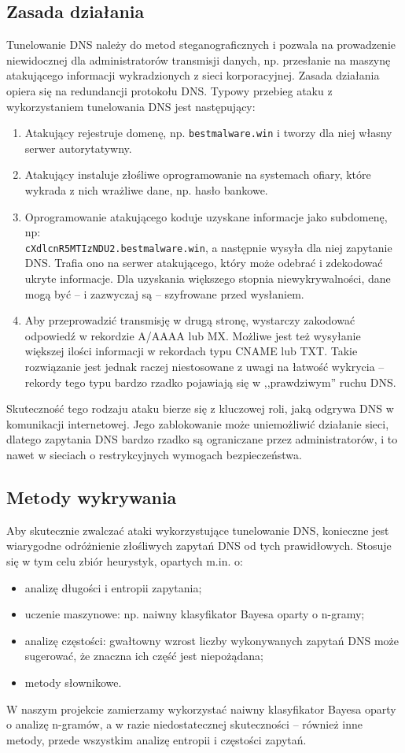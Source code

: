 \documentclass{eiti-raport}
\begin{document}
\subsection{Zasada działania}
Tunelowanie DNS należy do metod steganograficznych i pozwala na prowadzenie niewidocznej dla administratorów transmisji danych, np. przesłanie na maszynę atakującego informacji wykradzionych z sieci korporacyjnej. Zasada działania opiera się na redundancji protokołu DNS. Typowy przebieg ataku z wykorzystaniem tunelowania DNS jest następujący:
\begin{enumerate}
	\item Atakujący rejestruje domenę, np. \texttt{bestmalware.win} i tworzy dla niej własny serwer autorytatywny. 
	\item Atakujący instaluje złośliwe oprogramowanie na systemach ofiary, które wykrada z nich wrażliwe dane, np. hasło bankowe. 
	\item Oprogramowanie atakującego koduje uzyskane informacje jako subdomenę, np: \\  \texttt{cXdlcnR5MTIzNDU2.bestmalware.win}, a następnie wysyła dla niej zapytanie DNS. Trafia ono na serwer atakującego, który może odebrać i zdekodować ukryte informacje. Dla uzyskania większego stopnia niewykrywalności, dane mogą być -- i zazwyczaj są -- szyfrowane przed wysłaniem. 
	\item Aby przeprowadzić transmisję w drugą stronę, wystarczy zakodować odpowiedź w rekordzie A/AAAA lub MX. Możliwe jest też wysyłanie większej ilości informacji w rekordach typu CNAME lub TXT. Takie rozwiązanie jest jednak raczej niestosowane z uwagi na łatwość wykrycia -- rekordy tego typu bardzo rzadko pojawiają się w ,,prawdziwym'' ruchu DNS. 
\end{enumerate}
Skuteczność tego rodzaju ataku bierze się z kluczowej roli, jaką odgrywa DNS w komunikacji internetowej. Jego zablokowanie może uniemożliwić działanie sieci, dlatego zapytania DNS bardzo rzadko są ograniczane przez administratorów, i to nawet w sieciach o restrykcyjnych wymogach bezpieczeństwa. 

\subsection{Metody wykrywania}
Aby skutecznie zwalczać ataki wykorzystujące tunelowanie DNS, konieczne jest wiarygodne odróżnienie złośliwych zapytań DNS od tych prawidłowych. Stosuje się w tym celu zbiór heurystyk, opartych m.in. o:
\begin{itemize}
	\item analizę długości i entropii zapytania;
	\item uczenie maszynowe: np. naiwny klasyfikator Bayesa oparty o n-gramy;
	\item analizę częstości: gwałtowny wzrost liczby wykonywanych zapytań DNS może sugerować, że znaczna ich część jest niepożądana;
	\item metody słownikowe. 
\end{itemize}
W naszym projekcie zamierzamy wykorzystać naiwny klasyfikator Bayesa oparty o analizę n-gramów, a w razie niedostatecznej skuteczności -- również inne metody, przede wszystkim analizę entropii i częstości zapytań. 
\end{document}
